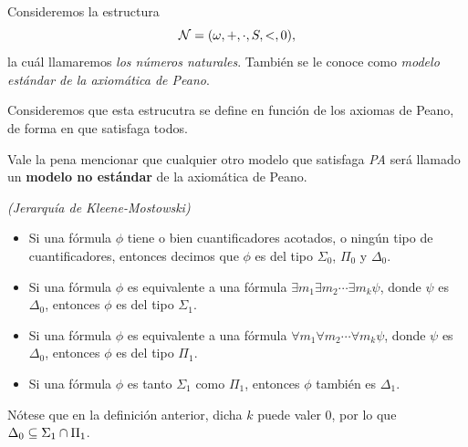 \begin{defn}
    Consideremos la estructura 
    \[\mathcal{N}=(\omega,+,\cdot,S,<,0),\]
    la cuál llamaremos \textit{los números naturales}. También se le conoce como \textit{modelo estándar de la axiomática de Peano}.
\end{defn}
Consideremos que esta estrucutra se define en función de los axiomas de Peano, de forma en que satisfaga todos.
\begin{obs}
    Vale la pena mencionar que cualquier otro modelo que satisfaga \textit{PA} será llamado un \textbf{modelo no estándar} de la axiomática de Peano.
\end{obs}

\begin{defn} \textit{(Jerarquía de Kleene-Mostowski)}
    \begin{itemize}
        \item Si una fórmula $\phi$ tiene o bien cuantificadores acotados, o ningún tipo de cuantificadores, entonces decimos que $\phi$ es del tipo $\Sigma_0$, $\Pi_0$ y $\Delta_0$.
        \item Si una fórmula $\phi$ es equivalente a una fórmula $\exists m_1\exists m_2\cdots\exists m_k\psi$, donde $\psi$ es $\Delta_0$, entonces $\phi$ es del tipo $\Sigma_1$.
        \item Si una fórmula $\phi$ es equivalente a una fórmula $\forall m_1\forall m_2\cdots\forall m_k\psi$, donde $\psi$ es $\Delta_0$, entonces $\phi$ es del tipo $\Pi_1$.
        \item Si una fórmula $\phi$ es tanto $\Sigma_1$ como $\Pi_1$, entonces $\phi$ también es $\Delta_1$.
    \end{itemize}
\end{defn}
Nótese que en la definición anterior, dicha $k$ puede valer $0$, por lo que $\Delta_0\subseteq\Sigma_1\cap\Pi_1$.